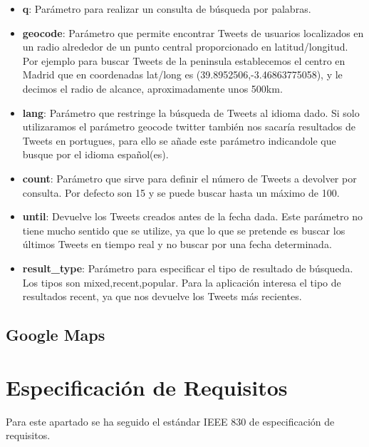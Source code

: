 \begin{itemize}

\item \textbf{q}: Parámetro para realizar un consulta de búsqueda por palabras.

\item \textbf{geocode}: Parámetro que permite encontrar Tweets de usuarios localizados en un radio alrededor de un punto central proporcionado en latitud/longitud. Por ejemplo para buscar Tweets de la peninsula establecemos el centro en Madrid que en coordenadas lat/long es (39.8952506,-3.46863775058), y le decimos el radio de alcance, aproximadamente unos  500km.

\item \textbf{lang}: Parámetro que restringe la búsqueda de Tweets al idioma dado. Si solo utilizaramos el parámetro geocode twitter también nos sacaría resultados de Tweets en portugues, para ello se añade este parámetro indicandole que busque por el idioma español(es).

\item \textbf{count}: Parámetro que sirve para definir el número de Tweets a devolver por consulta. Por defecto son 15 y se puede buscar hasta un máximo de 100.


\item \textbf{until}: Devuelve los Tweets creados antes de la fecha dada. Este parámetro no tiene mucho sentido que se utilize, ya que lo que se pretende es buscar los últimos Tweets en tiempo real y no buscar por una fecha determinada.

\item \textbf{result\_type}: Parámetro para especificar el tipo de resultado de búsqueda. Los tipos son mixed,recent,popular. Para la aplicación interesa el tipo de resultados recent, ya que nos devuelve los Tweets más recientes. 

\end{itemize}


\subsection{Google Maps}



\section{Especificación de Requisitos}

Para este apartado se ha seguido el estándar IEEE 830 de especificación de requisitos.

